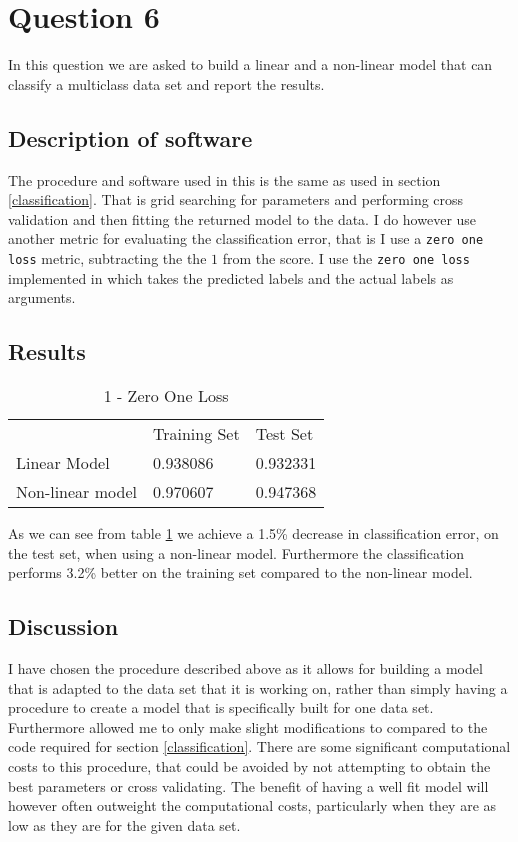 \section{Question 6}
In this question we are asked to build a linear and a non-linear model that can classify a multiclass data set and report the results.
\subsection{Description of software}
The procedure and software used in this is the same as used in section \ref{classification}. That is grid searching for parameters and performing cross validation and then fitting the returned model to the data. I do however use another metric for evaluating the classification error, that is I use a \texttt{zero one loss} metric, subtracting the the \(1\) from the score. I use the \texttt{zero one loss} implemented in \cite{scikit-learn} which takes the predicted labels and the actual labels as arguments.\\
\subsection{Results}

\begin{table}[h]
  \centering
  \begin{tabular}{lll}
                     & Training Set & Test Set \\
    Linear Model     & 0.938086     & 0.932331 \\
    Non-linear model & 0.970607     & 0.947368
  \end{tabular}
  \caption{1 - Zero One Loss}
  \label{classerr}
\end{table}

As we can see from table \ref{classerr} we achieve a 1.5\% decrease in classification error, on the test set, when using a non-linear model. Furthermore the classification performs 3.2\% better on the training set compared to the non-linear model. 

\subsection{Discussion}
I have chosen the procedure described above as it allows for building a model that is adapted to the data set that it is working on, rather than simply having a procedure to create a model that is specifically built for one data set. Furthermore allowed me to only make slight modifications to compared to the code required for section \ref{classification}. There are some significant computational costs to this procedure, that could be avoided by not attempting to obtain the best parameters or cross validating. The benefit of having a well fit model will however often outweight the computational costs, particularly when they are as low as they are for the given data set.
